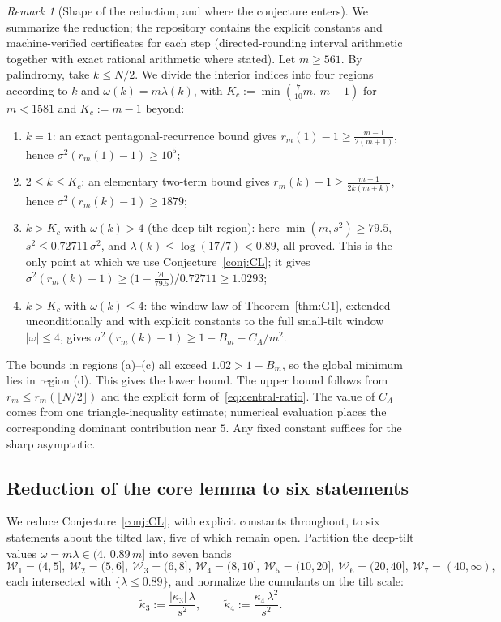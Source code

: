 \documentclass[11pt]{amsart}
\theoremstyle{plain}
\theoremstyle{definition}
\theoremstyle{remark}
\newtheorem{remark}[theorem]{Remark}
\begin{document}
\begin{remark}[Shape of the reduction, and where the conjecture enters]
\label{rem:reduction}
We summarize the reduction; the repository contains the explicit constants
and machine-verified certificates for each step (directed-rounding
interval arithmetic together with exact rational arithmetic where stated). Let $m\ge561$. By
palindromy, take $k\le N/2$. We divide the interior indices into four
regions according to $k$ and $\omega(k)=m\lambda(k)$, with
$K_c:=\min(\tfrac7{10}m,\,m-1)$ for $m<1581$ and $K_c:=m-1$ beyond:
\begin{enumerate}[label=(\alph*)]
\item $k=1$: an exact pentagonal-recurrence bound gives
$r_m(1)-1\ge\tfrac{m-1}{2(m+1)}$, hence $\sigma^2(r_m(1)-1)\ge10^5$;
\item $2\le k\le K_c$: an elementary two-term bound gives
$r_m(k)-1\ge\tfrac{m-1}{2k(m+k)}$, hence $\sigma^2(r_m(k)-1)\ge1879$;
\item $k>K_c$ with $\omega(k)>4$ (the deep-tilt region): here
$\min(m,s^2)\ge79.5$, $s^2\le0.72711\,\sigma^2$, and
$\lambda(k)\le\log(17/7)<0.89$, all proved. This is the only point at which we use
Conjecture~\ref{conj:CL}; it gives
$\sigma^2(r_m(k)-1)\ge\bigl(1-\tfrac{20}{79.5}\bigr)/0.72711\ge1.0293$;
\item $k>K_c$ with $\omega(k)\le4$: the window law of
Theorem~\ref{thm:G1}, extended unconditionally and with explicit
constants to the full small-tilt window $|\omega|\le4$, gives
$\sigma^2(r_m(k)-1)\ge1-B_m-C_A/m^2$.
\end{enumerate}
The bounds in regions (a)--(c) all exceed $1.02>1-B_m$, so the global
minimum lies in region (d). This gives the lower bound. The upper bound
follows from $r_m\le r_m(\lfloor N/2\rfloor)$ and the explicit form
of~\eqref{eq:central-ratio}. The value of $C_A$ comes from one
triangle-inequality estimate; numerical evaluation places the corresponding
dominant contribution near $5$. Any fixed constant suffices for the sharp
asymptotic.
\end{remark}

\subsection*{Reduction of the core lemma to six statements}
We reduce Conjecture~\ref{conj:CL}, with explicit constants throughout, to
six statements about the tilted law, five of which remain open.
Partition the deep-tilt values $\omega=m\lambda\in(4,\,0.89\,m]$ into
seven bands
\[
\mathcal W_1=(4,5],\ \mathcal W_2=(5,6],\ \mathcal W_3=(6,8],\
\mathcal W_4=(8,10],\ \mathcal W_5=(10,20],\ \mathcal W_6=(20,40],\
\mathcal W_7=(40,\infty),
\]
each intersected with $\{\lambda\le0.89\}$, and normalize the cumulants
on the tilt scale:
\[
\tilde\kappa_3:=\frac{|\kappa_3|\,\lambda}{s^2},\qquad
\tilde\kappa_4:=\frac{\kappa_4\,\lambda^2}{s^2}.
\]
\end{document}
